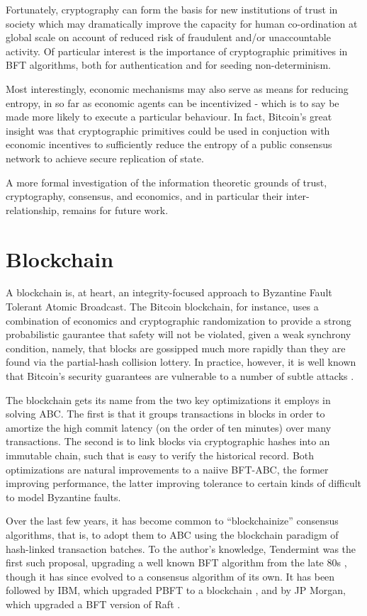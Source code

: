 Fortunately, cryptography can form the basis for new institutions of trust in society 
which may dramatically improve the capacity for human co-ordination at global scale on account
of reduced risk of fraudulent and/or unaccountable activity.
Of particular interest is the importance of cryptographic primitives in BFT algorithms,
both for authentication and for seeding non-determinism.

Most interestingly, economic mechanisms may also serve as means for reducing entropy,
in so far as economic agents can be incentivized - 
which is to say be made more likely to execute a particular behaviour.
In fact, Bitcoin's great insight was that cryptographic primitives could be used in
conjuction with economic incentives to sufficiently reduce the entropy of a public consensus network
to achieve secure replication of state.

A more formal investigation of the information theoretic grounds of trust, cryptography,
consensus, and economics, and in particular their inter-relationship, remains for future work.

\section{Blockchain}

A blockchain is, at heart, an integrity-focused approach to Byzantine Fault Tolerant Atomic Broadcast.
The Bitcoin blockchain, for instance, uses a combination of economics and cryptographic randomization 
to provide a strong probabilistic gaurantee that safety will not be violated, 
given a weak synchrony condition, namely, 
that blocks are gossipped much more rapidly than they are found via the partial-hash collision lottery.
In practice, however, it is well known that Bitcoin's security guarantees are vulnerable to a number 
of subtle attacks \cite{courtois2014subversive,eyal2014majority}.


The blockchain gets its name from the two key optimizations it employs in solving ABC.
The first is that it groups transactions in blocks in order to amortize the high commit latency 
(on the order of ten minutes) over many transactions.
The second is to link blocks via cryptographic hashes into an immutable chain,
such that is easy to verify the historical record.
Both optimizations are natural improvements to a naiive BFT-ABC,
the former improving performance, the latter improving tolerance to certain kinds 
of difficult to model Byzantine faults.

Over the last few years, it has become common to ``blockchainize'' consensus algorithms,
that is, to adopt them to ABC using the blockchain paradigm of hash-linked transaction batches.
To the author's knowledge, Tendermint was the first such proposal, 
upgrading a well known BFT algorithm from the late 80s \cite{dls},
though it has since evolved to a consensus algorithm of its own.
It has been followed by IBM, which upgraded PBFT to a blockchain \cite{cachin2016non,obc},
and by JP Morgan, which upgraded a BFT version of Raft \cite{juno}.

